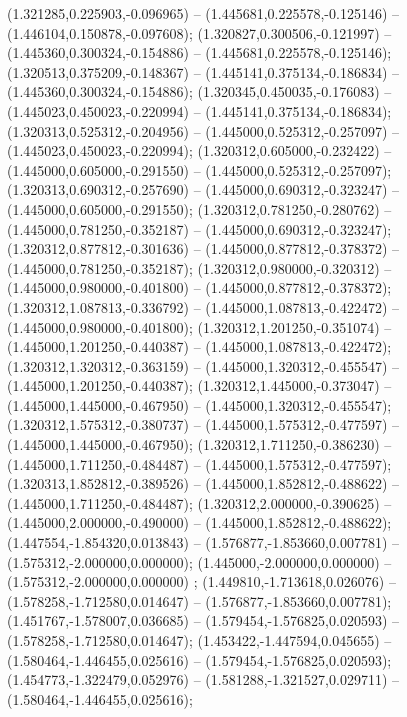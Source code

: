 (1.321285,0.225903,-0.096965) -- (1.445681,0.225578,-0.125146) -- (1.446104,0.150878,-0.097608);
 (1.320827,0.300506,-0.121997) -- (1.445360,0.300324,-0.154886) -- (1.445681,0.225578,-0.125146);
 (1.320513,0.375209,-0.148367) -- (1.445141,0.375134,-0.186834) -- (1.445360,0.300324,-0.154886);
 (1.320345,0.450035,-0.176083) -- (1.445023,0.450023,-0.220994) -- (1.445141,0.375134,-0.186834);
 (1.320313,0.525312,-0.204956) -- (1.445000,0.525312,-0.257097) -- (1.445023,0.450023,-0.220994);
 (1.320312,0.605000,-0.232422) -- (1.445000,0.605000,-0.291550) -- (1.445000,0.525312,-0.257097);
 (1.320313,0.690312,-0.257690) -- (1.445000,0.690312,-0.323247) -- (1.445000,0.605000,-0.291550);
 (1.320312,0.781250,-0.280762) -- (1.445000,0.781250,-0.352187) -- (1.445000,0.690312,-0.323247);
 (1.320312,0.877812,-0.301636) -- (1.445000,0.877812,-0.378372) -- (1.445000,0.781250,-0.352187);
 (1.320312,0.980000,-0.320312) -- (1.445000,0.980000,-0.401800) -- (1.445000,0.877812,-0.378372);
 (1.320312,1.087813,-0.336792) -- (1.445000,1.087813,-0.422472) -- (1.445000,0.980000,-0.401800);
 (1.320312,1.201250,-0.351074) -- (1.445000,1.201250,-0.440387) -- (1.445000,1.087813,-0.422472);
 (1.320312,1.320312,-0.363159) -- (1.445000,1.320312,-0.455547) -- (1.445000,1.201250,-0.440387);
 (1.320312,1.445000,-0.373047) -- (1.445000,1.445000,-0.467950) -- (1.445000,1.320312,-0.455547);
 (1.320312,1.575312,-0.380737) -- (1.445000,1.575312,-0.477597) -- (1.445000,1.445000,-0.467950);
 (1.320312,1.711250,-0.386230) -- (1.445000,1.711250,-0.484487) -- (1.445000,1.575312,-0.477597);
 (1.320313,1.852812,-0.389526) -- (1.445000,1.852812,-0.488622) -- (1.445000,1.711250,-0.484487);
 (1.320312,2.000000,-0.390625) -- (1.445000,2.000000,-0.490000) -- (1.445000,1.852812,-0.488622);
 (1.447554,-1.854320,0.013843) -- (1.576877,-1.853660,0.007781) -- (1.575312,-2.000000,0.000000);
 (1.445000,-2.000000,0.000000) -- (1.575312,-2.000000,0.000000) ;
 (1.449810,-1.713618,0.026076) -- (1.578258,-1.712580,0.014647) -- (1.576877,-1.853660,0.007781);
 (1.451767,-1.578007,0.036685) -- (1.579454,-1.576825,0.020593) -- (1.578258,-1.712580,0.014647);
 (1.453422,-1.447594,0.045655) -- (1.580464,-1.446455,0.025616) -- (1.579454,-1.576825,0.020593);
 (1.454773,-1.322479,0.052976) -- (1.581288,-1.321527,0.029711) -- (1.580464,-1.446455,0.025616);
